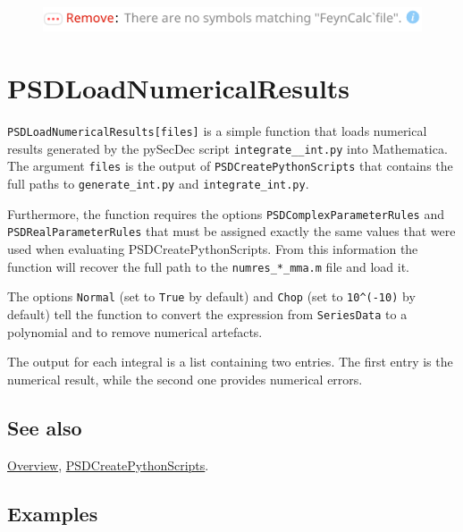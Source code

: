 \documentclass[../FeynHelpersManual.tex]{subfiles}
\begin{document}
\FloatBarrier
\begin{figure}[!ht]
\centering
\includegraphics[width=0.6\linewidth]{img/1ftg3ucp91fwc.pdf}
\end{figure}
\FloatBarrier

\hypertarget{psdloadnumericalresults}{
\section{PSDLoadNumericalResults}\label{psdloadnumericalresults}}

\texttt{PSDLoadNumericalResults[\allowbreak{}files]} is a simple
function that loads numerical results generated by the pySecDec script
\texttt{integrate__int.py} into Mathematica. The argument \texttt{files}
is the output of \texttt{PSDCreatePythonScripts} that contains the full
paths to \texttt{generate_int.py} and \texttt{integrate_int.py}.

Furthermore, the function requires the options
\texttt{PSDComplexParameterRules} and \texttt{PSDRealParameterRules}
that must be assigned exactly the same values that were used when
evaluating PSDCreatePythonScripts. From this information the function
will recover the full path to the \texttt{numres_*_mma.m} file and load
it.

The options \texttt{Normal} (set to \texttt{True} by default) and
\texttt{Chop} (set to \texttt{10^(-10)} by default) tell the function to
convert the expression from \texttt{SeriesData} to a polynomial and to
remove numerical artefacts.

The output for each integral is a list containing two entries. The first
entry is the numerical result, while the second one provides numerical
errors.

\subsection{See also}

\hyperlink{toc}{Overview},
\hyperlink{psdcreatepythonscripts}{PSDCreatePythonScripts}.

\subsection{Examples}

\begin{Shaded}
\begin{Highlighting}[]
\ExtensionTok{=} \OperatorTok{\{}
    \OperatorTok{[\{}\OperatorTok{,} \OperatorTok{,} \OperatorTok{,} \OperatorTok{,} \OperatorTok{\}],} 
    \OperatorTok{[\{}\OperatorTok{,} \OperatorTok{,} \OperatorTok{,} \OperatorTok{,} \OperatorTok{\}]\}}\NormalTok{;}
\end{Highlighting}
\end{Shaded}
\end{document}
